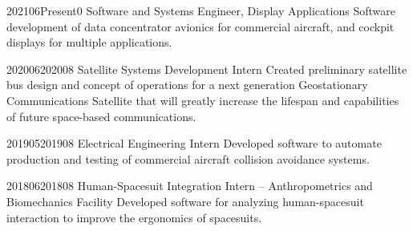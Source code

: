 \documentclass[../Gabriel_Roper_Resume]{subfiles}
\begin{document}

{2021}{06}{Present}{0}
{Software and Systems Engineer, Display Applications}
{Software development of data concentrator avionics for commercial aircraft, and cockpit displays for multiple applications. }

{2020}{06}{2020}{08}
{Satellite Systems Development Intern}
{Created preliminary satellite bus design and concept of operations
    for a next generation Geostationary Communications Satellite that will greatly increase the
    lifespan and capabilities of future space-based communications. }

{2019}{05}{2019}{08}
{Electrical Engineering Intern}
{Developed software to automate production and testing of commercial aircraft
    collision avoidance systems.}

{2018}{06}{2018}{08}
{Human-Spacesuit Integration Intern -- Anthropometrics and Biomechanics Facility}
{Developed software for analyzing human-spacesuit interaction to improve the ergonomics
    of spacesuits.}

\end{document}
